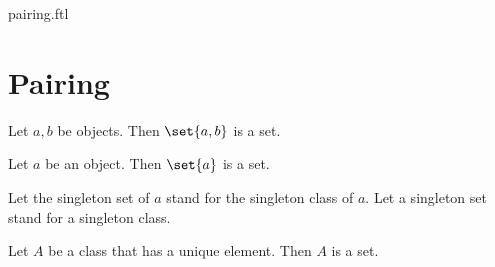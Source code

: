 \documentclass{naproche-library}
\begin{document}
\begin{smodule}{pairing.ftl}

  \section{Pairing}

  \begin{axiom}[forthel,title=Pairing Axiom,id=FOUNDATIONS_10_7376893816864768,printid]
    Let $a, b$ be objects.
    Then $\set{a, b}$ is a set.
  \end{axiom}
  
  \begin{proposition}[forthel,id=FOUNDATIONS_10_7556516257202176,printid]
    Let $a$ be an object.
    Then $\set{a}$ is a set.
  \end{proposition}

  \begin{forthel}
    Let the singleton set of $a$ stand for the singleton class of $a$.
    Let a singleton set stand for a singleton class.
  \end{forthel}
  
  \begin{corollary}[forthel,id=FOUNDATIONS_10_8408517115379712,printid]
    Let $A$ be a class that has a unique element.
    Then $A$ is a set.
  \end{corollary}
\end{smodule}
\end{document}

